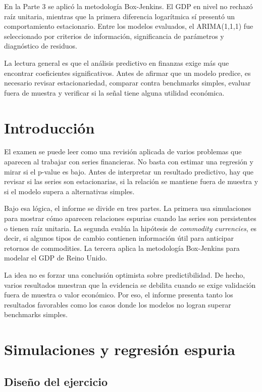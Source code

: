 \documentclass[11pt,a4paper]{article}
\begin{document}
En la Parte 3 se aplicó la metodología Box-Jenkins. El GDP en nivel no rechazó raíz unitaria, mientras que la primera diferencia logarítmica sí presentó un comportamiento estacionario. Entre los modelos evaluados, el ARIMA(1,1,1) fue seleccionado por criterios de información, significancia de parámetros y diagnóstico de residuos.

La lectura general es que el análisis predictivo en finanzas exige más que encontrar coeficientes significativos. Antes de afirmar que un modelo predice, es necesario revisar estacionariedad, comparar contra benchmarks simples, evaluar fuera de muestra y verificar si la señal tiene alguna utilidad económica.

\newpage

\section{Introducción}

El examen se puede leer como una revisión aplicada de varios problemas que aparecen al trabajar con series financieras. No basta con estimar una regresión y mirar si el p-value es bajo. Antes de interpretar un resultado predictivo, hay que revisar si las series son estacionarias, si la relación se mantiene fuera de muestra y si el modelo supera a alternativas simples.

Bajo esa lógica, el informe se divide en tres partes. La primera usa simulaciones para mostrar cómo aparecen relaciones espurias cuando las series son persistentes o tienen raíz unitaria. La segunda evalúa la hipótesis de \textit{commodity currencies}, es decir, si algunos tipos de cambio contienen información útil para anticipar retornos de commodities. La tercera aplica la metodología Box-Jenkins para modelar el GDP de Reino Unido.

La idea no es forzar una conclusión optimista sobre predictibilidad. De hecho, varios resultados muestran que la evidencia se debilita cuando se exige validación fuera de muestra o valor económico. Por eso, el informe presenta tanto los resultados favorables como los casos donde los modelos no logran superar benchmarks simples.

\newpage
\section{Simulaciones y regresión espuria}

\subsection{Diseño del ejercicio}
\end{document}
